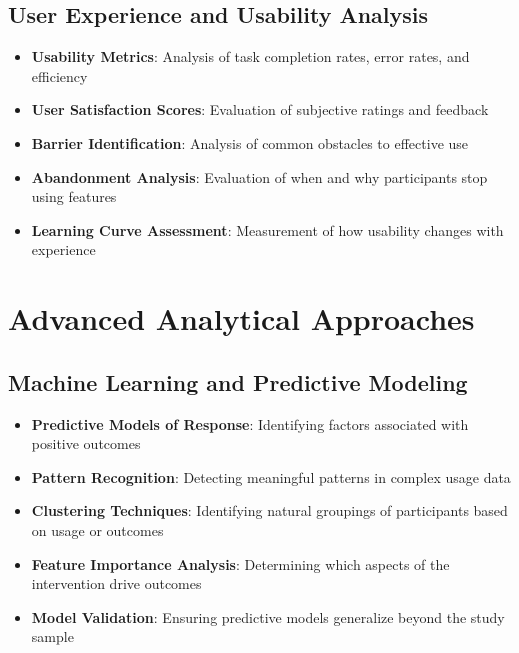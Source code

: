 \subsection{User Experience and Usability Analysis}
\begin{itemize}
    \item \textbf{Usability Metrics}: Analysis of task completion rates, error rates, and efficiency
    
    \item \textbf{User Satisfaction Scores}: Evaluation of subjective ratings and feedback
    
    \item \textbf{Barrier Identification}: Analysis of common obstacles to effective use
    
    \item \textbf{Abandonment Analysis}: Evaluation of when and why participants stop using features
    
    \item \textbf{Learning Curve Assessment}: Measurement of how usability changes with experience
\end{itemize}

\section{Advanced Analytical Approaches}
\subsection{Machine Learning and Predictive Modeling}
\begin{itemize}
    \item \textbf{Predictive Models of Response}: Identifying factors associated with positive outcomes
    
    \item \textbf{Pattern Recognition}: Detecting meaningful patterns in complex usage data
    
    \item \textbf{Clustering Techniques}: Identifying natural groupings of participants based on usage or outcomes
    
    \item \textbf{Feature Importance Analysis}: Determining which aspects of the intervention drive outcomes
    
    \item \textbf{Model Validation}: Ensuring predictive models generalize beyond the study sample
\end{itemize}

